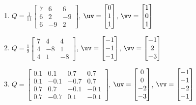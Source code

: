\begin{exercise}
\begin{enumerate}
\item \(Q=\frac1{11}\begin{bmatrix} 7&6&6
\\6&2&-9
\\6&-9&2 \end{bmatrix}\), 
\(\uv=\begin{bmatrix} 0\\1\\1 \end{bmatrix}\),
\(\vv=\begin{bmatrix} 1\\0\\1 \end{bmatrix}\)

\item \(Q=\frac19\begin{bmatrix} 7&4&4
\\4&-8&1
\\4&1&-8 \end{bmatrix}\), 
\(\uv=\begin{bmatrix} -1\\-1\\-1 \end{bmatrix}\),
\(\vv=\begin{bmatrix} -1\\2\\-3 \end{bmatrix}\)

\item \(Q=\begin{bmatrix} 0.1&0.1&0.7&0.7
\\0.1&-0.1&-0.7&0.7
\\0.7&0.7&-0.1&-0.1
\\0.7&-0.7&0.1&-0.1 \end{bmatrix}\), 
\(\uv=\begin{bmatrix} 0\\0\\-2\\-3 \end{bmatrix}\),
\(\vv=\begin{bmatrix} -1\\-1\\-2\\-1 \end{bmatrix}\)


\end{enumerate}
\end{exercise}
